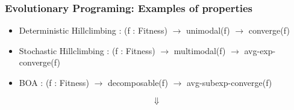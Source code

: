 \documentclass[aspectratio=169]{beamer}
\begin{document}





\begin{frame}
  \frametitle{Evolutionary Programing: Examples of properties}
  \begin{itemize}
  \item Deterministic Hillclimbing : (f : Fitness) $\rightarrow$ unimodal(f) $\rightarrow$ converge(f)
  \item Stochastic Hillclimbing : (f : Fitness) $\rightarrow$
    multimodal(f) $\rightarrow$ avg-exp-converge(f)
  \item BOA : (f : Fitness) $\rightarrow$ decomposable(f) $\rightarrow$ avg-subexp-converge(f)
  \end{itemize}

  $$\Downarrow$$
  

\end{frame}
\end{document}
